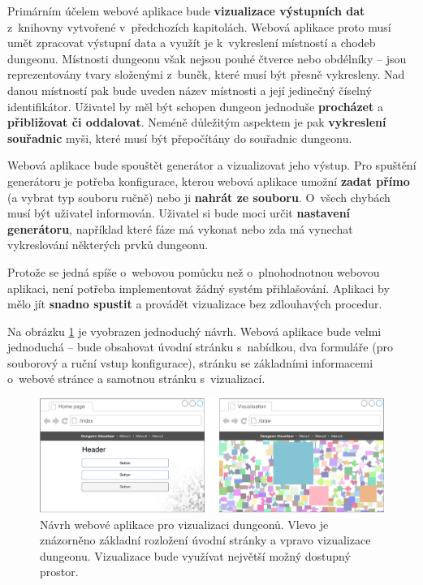 Primárním účelem webové aplikace bude \textbf{vizualizace výstupních dat} z~knihovny vytvořené v~předchozích kapitolách.
Webová aplikace proto musí umět zpracovat výstupní data a využít je k~vykreslení místností a chodeb dungeonu.
Místnosti dungeonu však nejsou pouhé čtverce nebo obdélníky -- jsou reprezentovány tvary složenými z~buněk, které musí být přesně vykresleny.
Nad danou místností pak bude uveden název místnosti a její jedinečný číselný identifikátor.
Uživatel by měl být schopen dungeon jednoduše \textbf{procházet} a \textbf{přibližovat či oddalovat}.
Neméně důležitým aspektem je pak \textbf{vykreslení souřadnic} myši, které musí být přepočítány do souřadnic dungeonu.
\par
Webová aplikace bude spouštět generátor a vizualizovat jeho výstup.
Pro spuštění generátoru je potřeba konfigurace, kterou webová aplikace umožní \textbf{zadat přímo} (a vybrat typ souboru ručně) nebo ji \textbf{nahrát ze souboru}.
O~všech chybách musí být uživatel informován.
Uživatel si bude moci určit \textbf{nastavení generátoru}, například které fáze má vykonat nebo zda má vynechat vykreslování některých prvků dungeonu.
\par
Protože se jedná spíše o~webovou pomůcku než o~plnohodnotnou webovou aplikaci, není potřeba implementovat žádný systém přihlašování.
Aplikaci by mělo jít \textbf{snadno spustit} a provádět vizualizace bez zdlouhavých procedur.
\par
Na obrázku \ref{img:web-mockup} je vyobrazen jednoduchý návrh.
Webová aplikace bude velmi jednoduchá -- bude obsahovat úvodní stránku s~nabídkou, dva formuláře (pro souborový a ruční vstup konfigurace), stránku se základními informacemi o~webové stránce a samotnou stránku s~vizualizací.
\begin{figure}[ht]
    \centering
    \includegraphics[width=1.00\textwidth]{obrazky/web-mockup.pdf}
    \caption{Návrh webové aplikace pro vizualizaci dungeonů. Vlevo je znázorněno základní rozložení úvodní stránky a vpravo vizualizace dungeonu. Vizualizace bude využívat největší možný dostupný prostor.}
    \label{img:web-mockup}
\end{figure}

